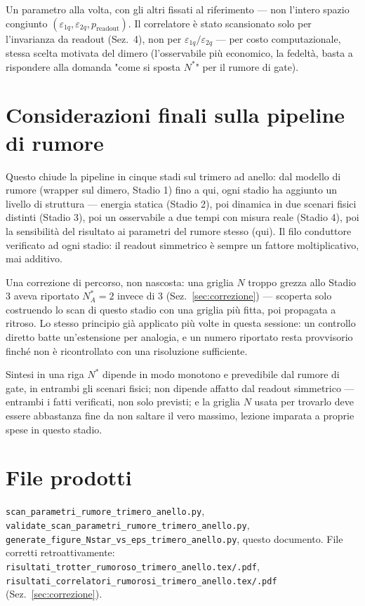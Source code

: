 \documentclass[11pt,a4paper]{article}
\begin{document}
Un parametro alla volta, con gli altri fissati al riferimento --- non
l'intero spazio congiunto $(\varepsilon_{1q},\varepsilon_{2q},
p_\text{readout})$. Il correlatore è stato scansionato solo per
l'invarianza da readout (Sez.~4), non per $\varepsilon_{1q}/\varepsilon_{2q}$
--- per costo computazionale, stessa scelta motivata del dimero
(l'osservabile più economico, la fedeltà, basta a rispondere alla
domanda "come si sposta $N^*$" per il rumore di gate).

\section{Considerazioni finali sulla pipeline di rumore}

Questo chiude la pipeline in cinque stadi sul trimero ad anello: dal
modello di rumore (wrapper sul dimero, Stadio 1) fino a qui, ogni stadio
ha aggiunto un livello di struttura --- energia statica (Stadio 2), poi
dinamica in due scenari fisici distinti (Stadio 3), poi un osservabile a
due tempi con misura reale (Stadio 4), poi la sensibilità del risultato
ai parametri del rumore stesso (qui). Il filo conduttore verificato ad
ogni stadio: il readout simmetrico è sempre un fattore moltiplicativo,
mai additivo.

Una correzione di percorso, non nascosta: una griglia $N$ troppo
grezza allo Stadio 3 aveva riportato $N^*_A=2$ invece di $3$
(Sez.~\ref{sec:correzione}) --- scoperta solo costruendo lo scan di
questo stadio con una griglia più fitta, poi propagata a ritroso. Lo
stesso principio già applicato più volte in questa sessione: un
controllo diretto batte un'estensione per analogia, e un numero riportato
resta provvisorio finché non è ricontrollato con una risoluzione
sufficiente.

\begin{okbox}{Sintesi in una riga}
$N^*$ dipende in modo monotono e prevedibile dal rumore di gate, in
entrambi gli scenari fisici; non dipende affatto dal readout simmetrico
--- entrambi i fatti verificati, non solo previsti; e la griglia $N$
usata per trovarlo deve essere abbastanza fine da non saltare il vero
massimo, lezione imparata a proprie spese in questo stadio.
\end{okbox}

\section*{File prodotti}

\texttt{scan\_\allowbreak parametri\_rumore\_trimero\_anello.py},
\texttt{validate\_\allowbreak scan\_\allowbreak parametri\_rumore\_trimero\_anello.py},
\texttt{generate\_figure\_\allowbreak Nstar\_vs\_eps\_trimero\_anello.py},
questo documento. File corretti retroattivamente:
\texttt{risultati\_\allowbreak trotter\_\allowbreak rumoroso\_trimero\_anello.tex/.pdf},
\texttt{risultati\_\allowbreak correlatori\_\allowbreak rumorosi\_trimero\_anello.tex/.pdf}
(Sez.~\ref{sec:correzione}).
\end{document}
